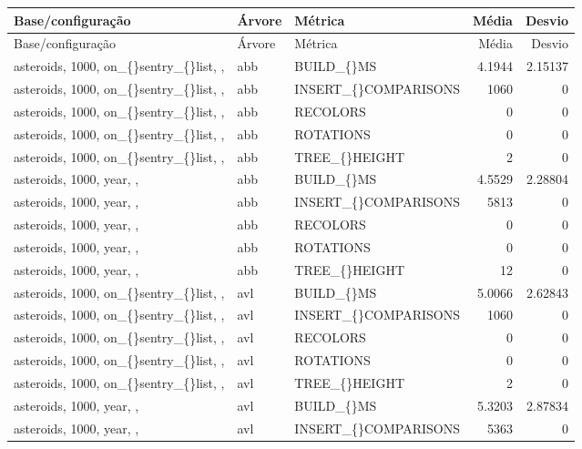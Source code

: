 \scriptsize
\begin{longtable}{p{4cm}p{1.4cm}p{2.6cm}rr}
\hline
Base/configuração & Árvore & Métrica & Média & Desvio\\
\hline
\endfirsthead
\hline
Base/configuração & Árvore & Métrica & Média & Desvio\\
\hline
\endhead
asteroids, 1000, on\_\allowbreak\{\}sentry\_\allowbreak\{\}list, ,  & abb & BUILD\_\allowbreak\{\}MS & 4.1944 & 2.15137\\
asteroids, 1000, on\_\allowbreak\{\}sentry\_\allowbreak\{\}list, ,  & abb & INSERT\_\allowbreak\{\}COMPARISONS & 1060 & 0\\
asteroids, 1000, on\_\allowbreak\{\}sentry\_\allowbreak\{\}list, ,  & abb & RECOLORS & 0 & 0\\
asteroids, 1000, on\_\allowbreak\{\}sentry\_\allowbreak\{\}list, ,  & abb & ROTATIONS & 0 & 0\\
asteroids, 1000, on\_\allowbreak\{\}sentry\_\allowbreak\{\}list, ,  & abb & TREE\_\allowbreak\{\}HEIGHT & 2 & 0\\
asteroids, 1000, year, ,  & abb & BUILD\_\allowbreak\{\}MS & 4.5529 & 2.28804\\
asteroids, 1000, year, ,  & abb & INSERT\_\allowbreak\{\}COMPARISONS & 5813 & 0\\
asteroids, 1000, year, ,  & abb & RECOLORS & 0 & 0\\
asteroids, 1000, year, ,  & abb & ROTATIONS & 0 & 0\\
asteroids, 1000, year, ,  & abb & TREE\_\allowbreak\{\}HEIGHT & 12 & 0\\
asteroids, 1000, on\_\allowbreak\{\}sentry\_\allowbreak\{\}list, ,  & avl & BUILD\_\allowbreak\{\}MS & 5.0066 & 2.62843\\
asteroids, 1000, on\_\allowbreak\{\}sentry\_\allowbreak\{\}list, ,  & avl & INSERT\_\allowbreak\{\}COMPARISONS & 1060 & 0\\
asteroids, 1000, on\_\allowbreak\{\}sentry\_\allowbreak\{\}list, ,  & avl & RECOLORS & 0 & 0\\
asteroids, 1000, on\_\allowbreak\{\}sentry\_\allowbreak\{\}list, ,  & avl & ROTATIONS & 0 & 0\\
asteroids, 1000, on\_\allowbreak\{\}sentry\_\allowbreak\{\}list, ,  & avl & TREE\_\allowbreak\{\}HEIGHT & 2 & 0\\
asteroids, 1000, year, ,  & avl & BUILD\_\allowbreak\{\}MS & 5.3203 & 2.87834\\
asteroids, 1000, year, ,  & avl & INSERT\_\allowbreak\{\}COMPARISONS & 5363 & 0\\

\end{longtable}
